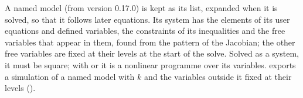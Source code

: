 A named model (from version 0.17.0) is kept as its list, expanded when it is
solved, so that it follows later equations. Its system has the elements of
its user equations and defined variables, the constraints of its
inequalities and the free variables that appear in them, found from the
pattern of the Jacobian; the other free variables are fixed at their levels
at the start of the solve. Solved as a system, it must be square; with
 or  it is a nonlinear programme over its
variables.  exports a simulation of a named model with
$k$ and the variables outside it fixed at
their levels ().


\begin{alsosee}
\end{alsosee}
